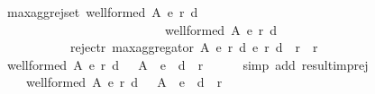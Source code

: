 \begin{isabellebody}
\isadelimdocument
%
\endisadelimdocument
%
\isatagdocument
%
\isamarkuptrue%
%
\endisatagdocument
{\isafolddocument}%
%
\isadelimdocument
%
\endisadelimdocument
{}\isamarkupfalse%
\ max{\isacharunderscore}{\kern0pt}agg{\isacharunderscore}{\kern0pt}rej{\isacharunderscore}{\kern0pt}set{\isacharcolon}{\kern0pt}\ {\isachardoublequoteopen}{\isacharparenleft}{\kern0pt}well{\isacharunderscore}{\kern0pt}formed\ A\ {\isacharparenleft}{\kern0pt}e{}{\isacharcomma}{\kern0pt}\ r{}{\isacharcomma}{\kern0pt}\ d{}{\isacharparenright}{\kern0pt}\ {\isasymand}\isanewline
\ \ \ \ \ \ \ \ \ \ \ \ \ \ \ \ \ \ \ \ \ \ \ \ \ \ well{\isacharunderscore}{\kern0pt}formed\ A\ {\isacharparenleft}{\kern0pt}e{}{\isacharcomma}{\kern0pt}\ r{}{\isacharcomma}{\kern0pt}\ d{}{\isacharparenright}{\kern0pt}{\isacharparenright}{\kern0pt}\ {\isasymlongrightarrow}\isanewline
\ \ \ \ \ \ \ \ \ \ \ reject{\isacharunderscore}{\kern0pt}r\ {\isacharparenleft}{\kern0pt}max{\isacharunderscore}{\kern0pt}aggregator\ A\ {\isacharparenleft}{\kern0pt}e{}{\isacharcomma}{\kern0pt}\ r{}{\isacharcomma}{\kern0pt}\ d{}{\isacharparenright}{\kern0pt}\ {\isacharparenleft}{\kern0pt}e{}{\isacharcomma}{\kern0pt}\ r{}{\isacharcomma}{\kern0pt}\ d{}{\isacharparenright}{\kern0pt}{\isacharparenright}{\kern0pt}\ {\isacharequal}{\kern0pt}\ r{}\ {\isasyminter}\ r{}{\isachardoublequoteclose}\isanewline
%
\isadelimproof
%
\endisadelimproof
%
\isatagproof
{}\isamarkupfalse%
\ {\isacharminus}{\kern0pt}\isanewline
\ \ \isamarkupfalse%
\ {\isachardoublequoteopen}well{\isacharunderscore}{\kern0pt}formed\ A\ {\isacharparenleft}{\kern0pt}e{}{\isacharcomma}{\kern0pt}\ r{}{\isacharcomma}{\kern0pt}\ d{}{\isacharparenright}{\kern0pt}\ {\isasymlongrightarrow}\ \ A\ {\isacharminus}{\kern0pt}\ {\isacharparenleft}{\kern0pt}e{}\ {\isasymunion}\ d{}{\isacharparenright}{\kern0pt}\ {\isacharequal}{\kern0pt}\ r{}{\isachardoublequoteclose}\isanewline
\ \ \ \ \isamarkupfalse%
\ {\isacharparenleft}{\kern0pt}simp\ add{\isacharcolon}{\kern0pt}\ result{\isacharunderscore}{\kern0pt}imp{\isacharunderscore}{\kern0pt}rej{\isacharparenright}{\kern0pt}\isanewline
\ \ \isamarkupfalse%
\ \isamarkupfalse%
\isanewline
\ \ \ \ {\isachardoublequoteopen}well{\isacharunderscore}{\kern0pt}formed\ A\ {\isacharparenleft}{\kern0pt}e{}{\isacharcomma}{\kern0pt}\ r{}{\isacharcomma}{\kern0pt}\ d{}{\isacharparenright}{\kern0pt}\ {\isasymlongrightarrow}\ \ A\ {\isacharminus}{\kern0pt}\ {\isacharparenleft}{\kern0pt}e{}\ {\isasymunion}\ d{}{\isacharparenright}{\kern0pt}\ {\isacharequal}{\kern0pt}\ r{}{\isachardoublequoteclose}\isanewline

\end{isabellebody}
